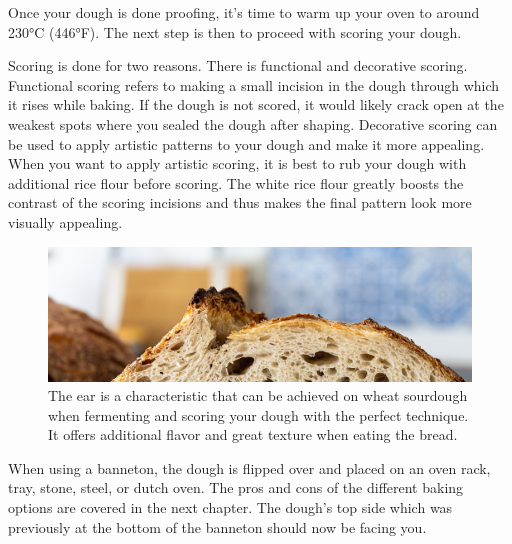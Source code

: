 Once your dough is done proofing, it's time to warm up your oven
to around 230°C (446°F). The next step is then to proceed with
scoring your dough.

Scoring is done for two reasons. There is functional and decorative
scoring. Functional scoring refers to making a small incision in the dough
through which it rises while baking. If the dough is not scored,
it would likely crack open at the weakest spots where you sealed
the dough after shaping. Decorative scoring can be used to apply
artistic patterns to your dough and make it more appealing. When
you want to apply artistic scoring, it is best to rub your dough
with additional rice flour before scoring. The white rice flour
greatly boosts the contrast of the scoring incisions and thus
makes the final pattern look more visually appealing.

\begin{figure}[htb!]
  \includegraphics[width=\textwidth]{the-ear}
  \caption{The ear is a characteristic that can be achieved on wheat sourdough
  when fermenting and scoring your dough with the perfect technique. It offers additional
  flavor and great texture when eating the bread.}%
  \label{fig:the-ear}
\end{figure}

When using a banneton, the dough is flipped over and
placed on an oven rack, tray, stone, steel, or dutch oven. The pros
and cons of the different baking options are covered in the next chapter.
The dough's top side which was previously at the bottom of the
banneton should now be facing you.

